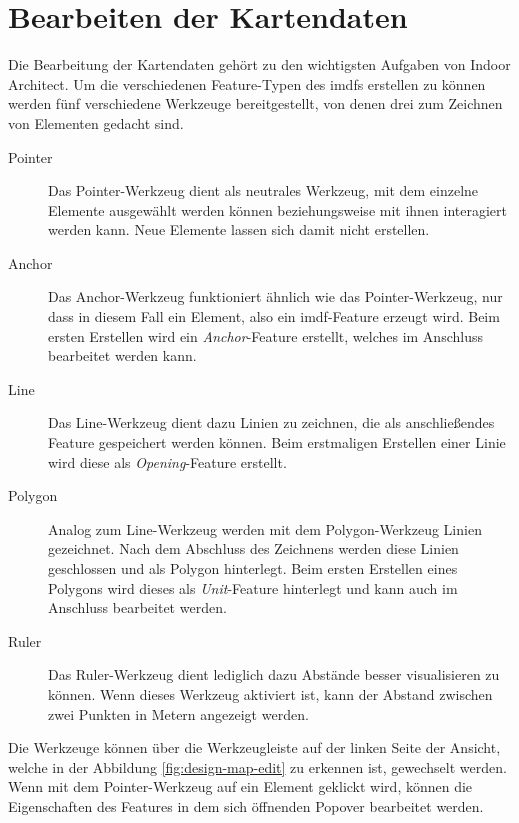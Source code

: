 \section{Bearbeiten der Kartendaten}
Die Bearbeitung der Kartendaten gehört zu den wichtigsten Aufgaben von Indoor Architect.
Um die verschiedenen Feature-Typen des \acl{imdf}s erstellen zu können werden fünf verschiedene Werkzeuge bereitgestellt, von denen drei zum Zeichnen von Elementen gedacht sind.
\begin{description}
\item[Pointer]
Das Pointer-Werkzeug dient als neutrales Werkzeug, mit dem einzelne Elemente ausgewählt werden können beziehungsweise mit ihnen interagiert werden kann.
Neue Elemente lassen sich damit nicht erstellen.
\item[Anchor]
Das Anchor-Werkzeug funktioniert ähnlich wie das Pointer-Werkzeug, nur dass in diesem Fall ein Element, also ein \ac{imdf}-Feature erzeugt wird.
Beim ersten Erstellen wird ein \emph{Anchor}-Feature erstellt, welches im Anschluss bearbeitet werden kann.
\item[Line]
Das Line-Werkzeug dient dazu Linien zu zeichnen, die als anschließendes Feature gespeichert werden können.
Beim erstmaligen Erstellen einer Linie wird diese als \emph{Opening}-Feature erstellt.
\item[Polygon]
Analog zum Line-Werkzeug werden mit dem Polygon-Werkzeug Linien gezeichnet.
Nach dem Abschluss des Zeichnens werden diese Linien geschlossen und als Polygon hinterlegt.
Beim ersten Erstellen eines Polygons wird dieses als \emph{Unit}-Feature hinterlegt und kann auch im Anschluss bearbeitet werden.
\item[Ruler]
Das Ruler-Werkzeug dient lediglich dazu Abstände besser visualisieren zu können.
Wenn dieses Werkzeug aktiviert ist, kann der Abstand zwischen zwei Punkten in Metern angezeigt werden.
\end{description}
Die Werkzeuge können über die Werkzeugleiste auf der linken Seite der Ansicht, welche in der Abbildung \ref{fig:design-map-edit} zu erkennen ist, gewechselt werden.
Wenn mit dem Pointer-Werkzeug auf ein Element geklickt wird, können die Eigenschaften des Features in dem sich öffnenden Popover bearbeitet werden.
